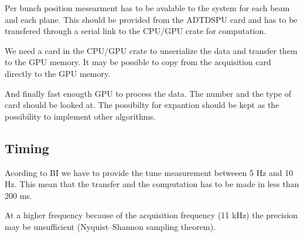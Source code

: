    Per bunch position mesearment has to be avalable to the system for each beam and each plane. This should be provided from the ADTDSPU card and has to be transfered through a serial link to the CPU/GPU crate for computation.

   We need a card in the CPU/GPU crate to unserialize the data and transfer them to the GPU memory. It may be possible to copy from the acquisition card directly to the GPU memory.

   And finally fast enougth GPU to process the data. The number and the type of card should be looked at. The possibilty for expantion should be kept as the possibility to implement other algorithms.
   
   \subsection{Timing}

   Acording to \gls{BI} we have to provide the tune measurement betweeen 5 Hz and 10 Hz. This mean that the transfer and the computation has to be made in less than 200 ms.

   At a higher frequency because of the acquisition frequency (11 kHz) the precision may be unsufficient (Nyquist–Shannon sampling theorem).